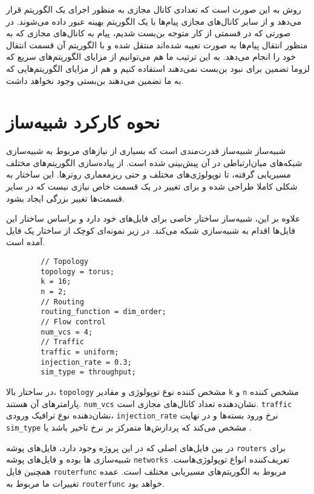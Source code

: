 روش  به این صورت است که تعدادی کانال مجازی به منظور اجرای یک الگوریتم  قرار می‌دهد و از سایر کانال‌های مجازی پیام‌ها با یک الگوریتم  بهینه عبور داده می‌شوند. در صورتی که در قسمتی از کار متوجه بن‌بست شدیم، پیام به کانال‌های مجازی که به منظور انتقال پیام‌ها به صورت  تعیبه شده‌اند منتقل شده و با الگوریتم آن قسمت انتقال خود را انجام می‌دهد. به این ترتیب ما هم می‌توانیم از مزایای الگوریتم‌های سریع  که لزوما تضمین برای نبود بن‌بست نمی‌دهند استفاده کنیم و هم از مزایای الگوریتم‌هایی که به ما تضمین می‌دهند بن‌بستی وجود نخواهد داشت.



\section{نحوه کارکرد شبیه‌ساز}


شبیه‌ساز  شبیه‌ساز قدرت‌مندی است که بسیاری از نیازهای مربوط به شبیه‌سازی شبکه‌های میان‌ارتباطی در آن پیش‌بینی شده است. از پیاده‌سازی الگوریتم‌های مختلف مسیریابی گرفته، تا توپولوژی‌های مختلف و حتی ریزمعماری روترها. این ساختار به شکلی کاملا  طراحی شده و برای تغییر در یک قسمت خاص نیازی نیست که در سایر قسمت‌ها تغییر بزرگی ایجاد بشود.


علاوه بر این،‌ شبیه‌ساز  ساختار خاصی برای فایل‌های  خود دارد و براساس ساختار این فایل‌ها اقدام به شبیه‌سازی شبکه می‌کند. در زیر نمونه‌ای کوچک از ساختار یک فایل  آمده است.


\begin{latin}
	
	\begin{verbatim}
		// Topology
		topology = torus;
		k = 16;
		n = 2;
		// Routing
		routing_function = dim_order;
		// Flow control
		num_vcs = 4;
		// Traffic
		traffic = uniform;
		injection_rate = 0.3;
		sim_type = throughput;
	\end{verbatim}
\end{latin}

در ساختار بالا، \verb*|topology| مشخص کننده نوع توپولوژی و مقادیر \verb*|k| و \verb*|n| مشخص کننده پارامترهای آن هستند. \verb*|num_vcs| نشان‌دهنده تعداد کانال‌های مجازی است. \verb*|traffic| نشان‌دهنده نوع ترافیک ورودی، \verb*|injection_rate| نرخ ورود بسته‌ها و در نهایت \verb*|sim_type| مشخص می‌کند که پردازش‌ها متمرکز بر نرخ تاخیر باشد یا .

در بین فایل‌های اصلی که در این پروژه وجود دارد، فایل‌های پوشه \verb*|routers| برای شبیه‌سازی  ها بوده و فایل‌های پوشه \verb*|networks| تعریف‌کننده انواع توپولوژی‌هاست. همچنین فایل \verb*|routerfunc| مربوط به الگوریتم‌های مسیریابی‌ مختلف است. عمده تغییرات ما مربوط به \verb*|routerfunc|  خواهد بود.





